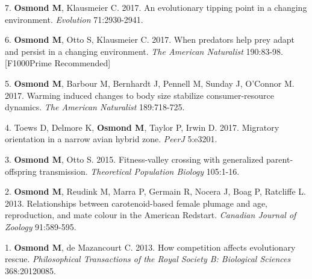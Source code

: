 \documentclass[12pt]{article}
\begin{document}
\noindent\hspace{.1cm}7. \textbf{Osmond M}, Klausmeier C. 2017. An evolutionary tipping point in a changing environment. \textit{Evolution} 71:2930-2941.

\noindent\hspace{.1cm}6. \textbf{Osmond M}, Otto S, Klausmeier C. 2017. When predators help prey adapt and persist in a changing environment. \textit{The American Naturalist} 190:83-98. [F1000Prime Recommended]

\noindent\hspace{.1cm}5. \textbf{Osmond M}, Barbour M, Bernhardt J, Pennell M, Sunday J, O'Connor M. 2017. Warming induced changes to body size stabilize consumer-resource dynamics. \textit{The American Naturalist} 189:718-725.

\noindent\hspace{.1cm}4. Toews D, Delmore K, \textbf{Osmond M}, Taylor P, Irwin D. 2017. Migratory orientation in a narrow avian hybrid zone. \textit{PeerJ} 5:e3201.

\noindent\hspace{.1cm}3. \textbf{Osmond M}, Otto S. 2015. Fitness-valley crossing with generalized parent-offspring transmission. \textit{Theoretical Population Biology} 105:1-16. %

\noindent\hspace{.1cm}2. \textbf{Osmond M}, Reudink M, Marra P, Germain R, Nocera J,  Boag P, Ratcliffe L.  2013. Relationships between carotenoid-based female plumage and age, reproduction, and mate colour in the American Redstart. \textit{Canadian Journal of Zoology} 91:589-595. %

\noindent\hspace{.1cm}1. \textbf{Osmond M}, de Mazancourt C. 2013. How competition affects evolutionary rescue. \textit{Philosophical Transactions of the Royal Society B: Biological Sciences} 368:20120085. %

%
\end{document}

